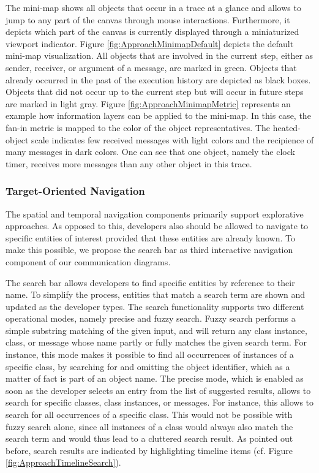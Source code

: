 The mini-map shows all objects that occur in a trace at a glance and allows to jump to any part of the canvas through mouse interactions.
Furthermore, it depicts which part of the canvas is currently displayed through a miniaturized viewport indicator.
Figure \ref{fig:ApproachMinimapDefault} depicts the default mini-map visualization.
All objects that are involved in the current step, either as sender, receiver, or argument of a message, are marked in green.
Objects that already occurred in the past of the execution history are depicted as black boxes.
Objects that did not occur up to the current step but will occur in future steps are marked in light gray.
Figure \ref{fig:ApproachMinimapMetric} represents an example how information layers can be applied to the mini-map.
In this case, the fan-in metric is mapped to the color of the object representatives.
The heated-object scale indicates few received messages with light colors and the recipience of many messages in dark colors.
One can see that one object, namely the clock timer, receives more messages than any other object in this trace.

\subsubsection{Target-Oriented Navigation}
The spatial and temporal navigation components primarily support explorative approaches.
As opposed to this, developers also should be allowed to navigate to specific entities of interest provided that these entities are already known.
To make this possible, we propose the search bar as third interactive navigation component of our communication diagrams.

The search bar allows developers to find specific entities by reference to their name.
To simplify the process, entities that match a search term are shown and updated as the developer types.
The search functionality supports two different operational modes, namely precise and fuzzy search.
Fuzzy search performs a simple substring matching of the given input, and will return any class instance, class, or message whose name partly or fully matches the given search term.
For instance, this mode makes it possible to find all occurrences of instances of a specific class, by searching for  and omitting the object identifier, which as a matter of fact is part of an object name.
The precise mode, which is enabled as soon as the developer selects an entry from the list of suggested results, allows to search for specific classes, class instances, or messages.
For instance, this allows to search for all occurrences of a specific class.
This would not be possible with fuzzy search alone, since all instances of a class would always also match the search term and would thus lead to a cluttered search result.
As pointed out before, search results are indicated by highlighting timeline items (cf. Figure \ref{fig:ApproachTimelineSearch}).

